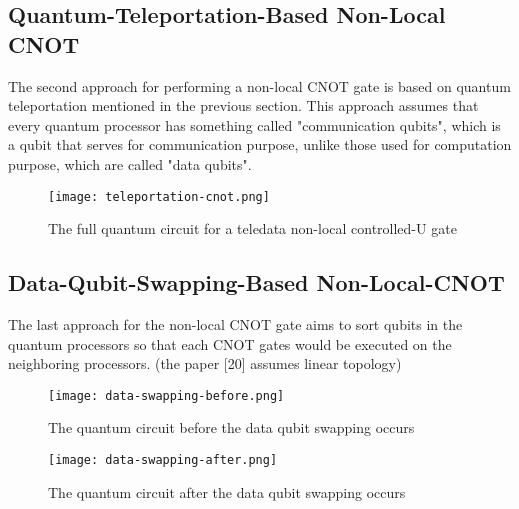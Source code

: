 \subsection{Quantum-Teleportation-Based Non-Local CNOT}

 The second approach for performing a non-local CNOT gate is based on quantum teleportation mentioned in the previous section.  This approach assumes that every quantum processor has something called "communication qubits", which is a qubit that serves for communication purpose, unlike those used for computation purpose, which are called "data qubits".
 
 \begin{figure}[h]
  		\begin{center}
  			\texttt{[image: teleportation-cnot.png]}
			\caption{The full quantum circuit for a teledata non-local controlled-U gate}
			\label{Fig3}
		\end{center}
	\end{figure}
	
\subsection{Data-Qubit-Swapping-Based Non-Local-CNOT}

The last approach for the non-local CNOT gate aims to sort qubits in the quantum processors so that each CNOT gates would be executed on the neighboring processors. (the paper [20] assumes linear topology)

\begin{figure}[h]
  		\begin{center}
  			\texttt{[image: data-swapping-before.png]}
			\caption{The quantum circuit before the data qubit swapping occurs}
			\label{Fig3}
		\end{center}
	\end{figure}
	
\begin{figure}[h]
  		\begin{center}
  			\texttt{[image: data-swapping-after.png]}
			\caption{The quantum circuit after the data qubit swapping occurs}
			\label{Fig3}
		\end{center}
	\end{figure}
\newpage

